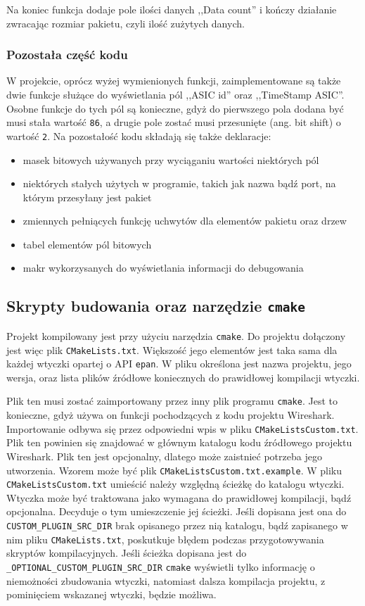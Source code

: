 \documentclass[a4paper, 12pt, twoside, openright]{article}
\begin{document}
	Na koniec funkcja dodaje pole ilości danych ,,Data count'' i kończy działanie zwracając rozmiar pakietu, czyli ilość zużytych danych.

	\subsubsection{Pozostała część kodu}
	W projekcie, oprócz wyżej wymienionych funkcji, zaimplementowane są także dwie funkcje służące do wyświetlania pól ,,ASIC id'' oraz ,,TimeStamp ASIC''.
	Osobne funkcje do tych pól są konieczne, gdyż do pierwszego pola dodana być musi stała wartość \texttt{86}, a drugie pole zostać musi przesunięte (ang. bit shift)
	o wartość \texttt{2}. Na pozostałość kodu składają się także deklaracje:
	\begin{itemize}
		\item masek bitowych używanych przy wyciąganiu wartości niektórych pól
		\item niektórych stałych użytych w programie, takich jak nazwa bądź port, na którym przesyłany jest pakiet
		\item zmiennych pełniących funkcję uchwytów dla elementów pakietu oraz drzew
		\item tabel elementów pól bitowych
		\item makr wykorzysanych do wyświetlania informacji do debugowania
	\end{itemize}

	\subsection{Skrypty budowania oraz narzędzie \texttt{cmake}}

	Projekt kompilowany jest przy użyciu narzędzia \texttt{cmake}. Do projektu dołączony jest więc plik \texttt{CMakeLists.txt}.
	Większość jego elementów jest taka sama dla każdej wtyczki opartej o API \texttt{epan}.
	W pliku określona jest nazwa projektu, jego wersja, oraz lista plików źródłowe koniecznych do prawidłowej kompilacji wtyczki.

	Plik ten musi zostać zaimportowany przez inny plik programu \texttt{cmake}. Jest to konieczne, gdyż używa on funkcji pochodzących z kodu projektu Wireshark.
	Importowanie odbywa się przez odpowiedni wpis w pliku \texttt{CMakeListsCustom.txt}. Plik ten powinien się znajdować w głównym katalogu kodu źródłowego
	projektu Wireshark. Plik ten jest opcjonalny, dlatego może zaistnieć potrzeba jego utworzenia. Wzorem może być plik \texttt{CMakeListsCustom.txt.example}.
	W pliku \texttt{CMakeListsCustom.txt} umieścić należy względną ścieżkę do katalogu wtyczki. Wtyczka może być traktowana jako wymagana do prawidłowej kompilacji, bądź opcjonalna.
	Decyduje o tym umieszczenie jej ścieżki. Jeśli dopisana jest ona do \texttt{CUSTOM\_PLUGIN\_SRC\_DIR} brak opisanego przez nią katalogu, bądź zapisanego w nim pliku \texttt{CMakeLists.txt},
	poskutkuje błędem podczas przygotowywania skryptów kompilacyjnych. Jeśli ścieżka dopisana jest do \texttt{\_OPTIONAL\_CUSTOM\_PLUGIN\_SRC\_DIR} \texttt{cmake}
	wyświetli tylko informację o niemożności zbudowania wtyczki, natomiast dalsza kompilacja projektu, z pominięciem wskazanej wtyczki, będzie możliwa.
\end{document}
